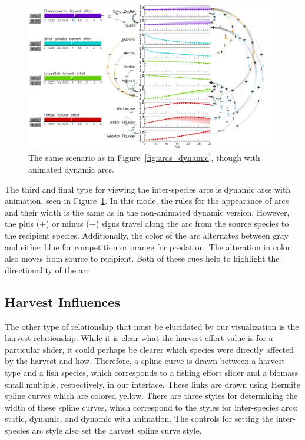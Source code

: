 \begin{figure}[h]
	\centering
	\includegraphics[width=0.98\textwidth]{figures/png/arcs_dynamic_animated.png}
	\caption{The same scenario as in Figure~\ref{fig:arcs_dynamic}, though with animated dynamic arcs.}
	\label{fig:arcs_dynamic_animated}
\end{figure}

The third and final type for viewing the inter-species arcs is dynamic arcs with animation, seen in Figure~\ref{fig:arcs_dynamic_animated}.  In this mode, the rules for the appearance of arcs and their width is the same as in the non-animated dynamic version.  However, the plus ($+$) or minus ($-$) signs travel along the arc from the source species to the recipient species.  Additionally, the color of the arc alternates between gray and either blue for competition or orange for predation.  The alteration in color also moves from source to recipient.  Both of these cues help to highlight the directionality of the arc.

\subsection{Harvest Influences}

The other type of relationship that must be elucidated by our visualization is the harvest relationship.  While it is clear what the harvest effort value is for a particular slider, it could perhaps be clearer which species were directly affected by the harvest and how.  Therefore, a spline curve is drawn between a harvest type and a fish species, which corresponds to a fishing effort slider and a biomass small multiple, respectively, in our interface.  These links are drawn using Hermite spline curves which are colored yellow.  There are three styles for determining the width of these spline curves, which correspond to the styles for inter-species arcs: static, dynamic, and dynamic with animation.  The controls for setting the inter-species arc style also set the harvest spline curve style.  

